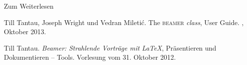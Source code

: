 \begin{Frame}{Zum Weiterlesen}
  \begin{mybib}
      Till Tantau, Joseph Wright und Vedran Mileti\'c.
      \newblock The \textsc{beamer} \textit{class}, User Guide.
      \newblock {}, Oktober 2013.

      Till Tantau.
      \newblock \emph{Beamer: Strahlende Vorträge mit \LaTeX},
      \newblock Präsentieren und Dokumentieren -- Tools.
      \newblock Vorlesung vom 31. Oktober 2012.
  \end{mybib}
\end{Frame}